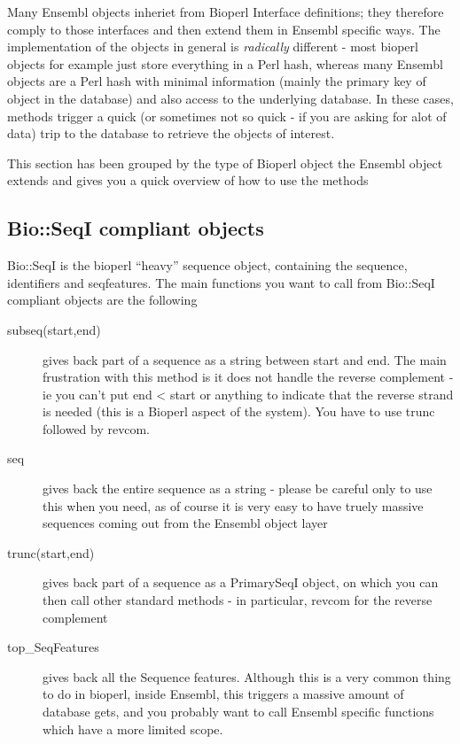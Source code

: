 \documentclass[11pt,a4paper]{article}
\begin{document}
Many Ensembl objects inheriet from Bioperl Interface definitions; they
therefore comply to those interfaces and then extend them in Ensembl
specific ways. The implementation of the objects in general is
\emph{radically} different - most bioperl objects for example just
store everything in a Perl hash, whereas many Ensembl objects are a
Perl hash with minimal information (mainly the primary key of object
in the database) and also access to the underlying database. In these
cases, methods trigger a quick (or sometimes not so quick - if you are
asking for alot of data) trip to the database to retrieve the objects
of interest.

This section has been grouped by the type of Bioperl object the Ensembl
object extends and gives you a quick overview of how to use the methods

\subsection{Bio::SeqI compliant objects}

Bio::SeqI is the bioperl ``heavy'' sequence object, containing the
sequence, identifiers and seqfeatures. The main functions you want to
call from Bio::SeqI compliant objects are the following

\begin{description}
\item[subseq(start,end)] gives back part of a sequence as a string between start and end. The main
frustration with this method is it does not handle the reverse complement - ie you can't put end < start or 
anything to indicate that the reverse strand is needed (this is a Bioperl aspect of the system). You have
to use trunc followed by revcom.
\item[seq] gives back the entire sequence as a string - please be careful only to use this when
you need, as of course it is very easy to have truely massive sequences coming out from the
Ensembl object layer
\item[trunc(start,end)] gives back part of a sequence as a PrimarySeqI object, on which you
can then call other standard methods - in particular, revcom for the reverse complement
\item[top\_SeqFeatures] gives back all the Sequence features. Although this is a very common
thing to do in bioperl, inside Ensembl, this triggers a massive amount of database gets, and you
probably want to call Ensembl specific functions which have a more limited scope.
\end{description}
\end{document}
